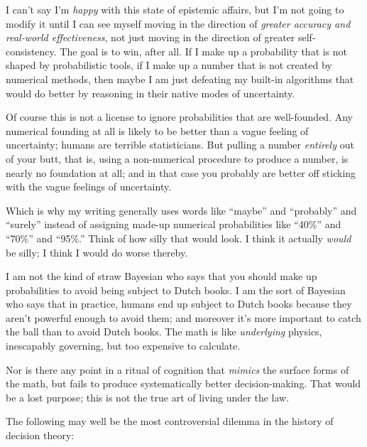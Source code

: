 I can't say I'm \textit{happy}
with this state of epistemic affairs, but I'm not going
to modify it until I can see myself moving in the direction of
\textit{greater accuracy and real-world effectiveness}, not just moving
in the direction of greater self-consistency. The goal is to win, after
all. If I make up a probability that is not shaped by probabilistic
tools, if I make up a number that is not created by numerical methods,
then maybe I am just defeating my built-in algorithms that would do
better by reasoning in their native modes of uncertainty.


 Of course this is not a license to ignore probabilities that are
well-founded. Any numerical founding at all is likely to be better than
a vague feeling of uncertainty; humans are terrible statisticians. But
pulling a number \textit{entirely} out of your butt, that is, using a
non-numerical procedure to produce a number, is nearly no foundation at
all; and in that case you probably are better off sticking with the
vague feelings of uncertainty.


 Which is why my writing generally uses words like
``maybe'' and
``probably'' and
``surely'' instead of assigning
made-up numerical probabilities like
``40\%'' and
``70\%'' and
``95\%.'' Think of how silly that
would look. I think it actually \textit{would} be silly; I think I
would do worse thereby.


 I am not the kind of straw Bayesian who says that you should make
up probabilities to avoid being subject to Dutch books. I am the sort
of Bayesian who says that in practice, humans end up subject to Dutch
books because they aren't powerful enough to avoid
them; and moreover it's more important to catch the
ball than to avoid Dutch books. The math is like \textit{underlying}
physics, inescapably governing, but too expensive to calculate.


 Nor is there any point in a ritual of cognition that
\textit{mimics} the surface forms of the math, but fails to produce
systematically better decision-making. That would be a lost purpose;
this is not the true art of living under the law.

\myendsectiontext



 The following may well be the most controversial dilemma in the
history of decision theory:

